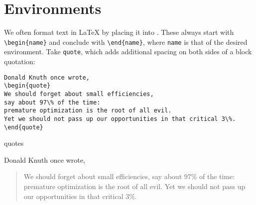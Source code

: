 \section{Environments}

We often format text in \LaTeX{} by placing it into .
These always start with \verb|\begin{name}| and conclude with \verb|\end{name}|,
where \texttt{name} is that of the desired environment.
Take \texttt{quote}, which adds additional spacing on both sides of a block
quotation:
\begin{leftfigure}
\begin{lstlisting}
Donald Knuth once wrote,
\begin{quote}
We should forget about small efficiencies,
say about 97\% of the time:
premature optimization is the root of all evil.
Yet we should not pass up our opportunities in that critical 3\%.
\end{quote}
\end{lstlisting}
\end{leftfigure}
quotes
\begin{leftfigure}
\lm
Donald Knuth once wrote,
\begin{quote}
We should forget about small efficiencies,
say about 97\% of the time:
premature optimization is the root of all evil.
Yet we should not pass up our opportunities in that critical 3\%.
\end{quote}
\end{leftfigure}


